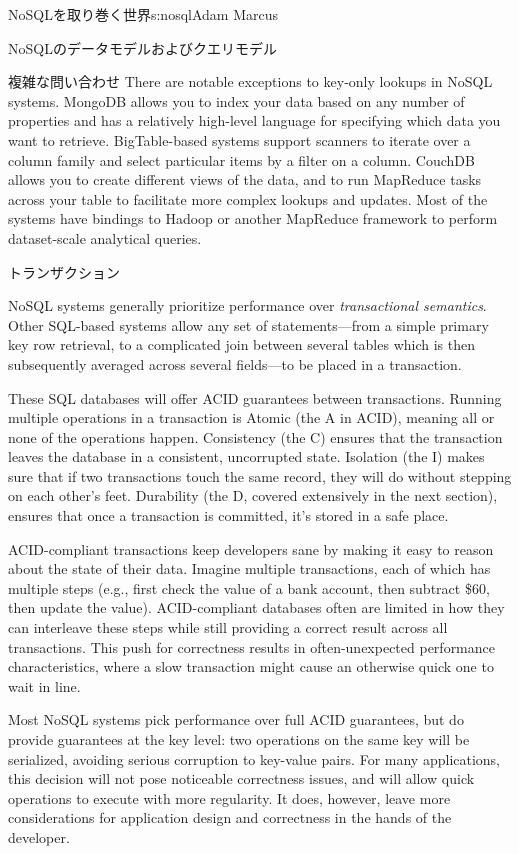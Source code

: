 \begin{aosachapter}{NoSQLを取り巻く世界}{s:nosql}{Adam Marcus}
\begin{aosasect1}{NoSQLのデータモデルおよびクエリモデル}
\begin{aosasect2}{複雑な問い合わせ}
There are notable exceptions to key-only lookups in NoSQL systems.
MongoDB allows you to index your data based on any number of
properties and has a relatively high-level language for specifying
which data you want to retrieve.  BigTable-based systems support
scanners to iterate over a column family and select particular items by a
filter on a column.  CouchDB allows you to create different views of
the data, and to run MapReduce tasks across your table to facilitate
more complex lookups and updates.  Most of the systems have bindings
to Hadoop or another MapReduce framework to perform dataset-scale
analytical queries.

\end{aosasect2}

\begin{aosasect2}{トランザクション}

NoSQL systems generally prioritize performance over
\emph{transactional semantics}.  Other SQL-based systems allow any set
of statements---from a simple primary key row retrieval, to a
complicated join between several tables which is then subsequently
averaged across several fields---to be placed in a transaction.

These SQL databases will offer ACID guarantees between transactions.
Running multiple operations in a transaction is Atomic (the A in
ACID), meaning all or none of the operations happen.  Consistency (the
C) ensures that the transaction leaves the database in a consistent,
uncorrupted state.  Isolation (the I) makes sure that if two
transactions touch the same record, they will do without stepping on
each other's feet.  Durability (the D, covered extensively in the next
section), ensures that once a transaction is committed, it's stored in
a safe place.

ACID-compliant transactions keep developers sane by making it easy to
reason about the state of their data.  Imagine multiple
transactions, each of which has multiple steps (e.g., first check the
value of a bank account, then subtract \$60, then update the
value). ACID-compliant databases often are limited in how they can
interleave these steps while still providing a correct result across
all transactions.  This push for correctness results in
often-unexpected performance characteristics, where a slow transaction
might cause an otherwise quick one to wait in line.

Most NoSQL systems pick performance over full ACID guarantees, but do
provide guarantees at the key level: two operations on the same key
will be serialized, avoiding serious corruption to key-value pairs.
For many applications, this decision will not pose noticeable
correctness issues, and will allow quick operations to execute with
more regularity.  It does, however, leave more considerations for
application design and correctness in the hands of the developer.


\end{aosasect2}
\end{aosasect1}
\end{aosachapter}

